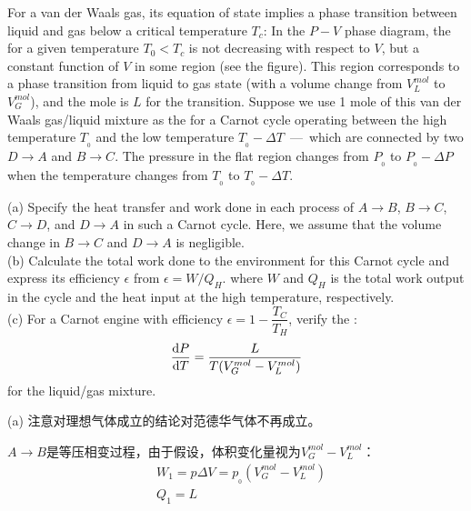 \begin{solution}
    For a van der Waals gas, its equation of state implies a phase transition between
    liquid and gas below a critical temperature $T_c$: In the $P-V$ phase
    diagram, the  for a given temperature $T_{0} < T_{c}$ is not 
    decreasing with respect to $V$, but a constant function of $V$ in some region (see the
    figure). This region corresponds to a phase transition from liquid to gas state (with a
    volume change from $V_{L}^{mol}$ to $V_{G}^{mol}$), and the mole  is $L$ for the transition.
    Suppose we use 1 mole of this van der Waals gas/liquid mixture as the  for
    a Carnot cycle operating between the high temperature $T_{_0}$ and the low temperature
    $T_{_0}-\Delta T$\ —\ which are connected by two  $D\rightarrow A$ and $B\rightarrow C$.
    The pressure in the flat region changes from $P_{_0}$ to $P_{_0}-\Delta P$ when the temperature
    changes from $T_{_0}$ to $T_{_0}-\Delta T$.

    (a) Specify the heat transfer and work done in each process of $A\rightarrow B$, $B\rightarrow C$,
    $C\rightarrow D$, and $D\rightarrow A$ in such a Carnot cycle. Here, we assume that the volume
    change in $B\rightarrow C$ and $D\rightarrow A$ is negligible.\\
    (b) Calculate the total work done to the environment for this Carnot cycle and express
    its efficiency $\epsilon$ from $\epsilon = W/Q_H$. where $W$ and $Q_H$ is the total work output in
    the cycle and the heat input at the high temperature, respectively.\\
    (c) For a Carnot engine with efficiency $\epsilon = 1-\dfrac{T_C}{T_H}$, verify the :
    \begin{equation*}
        \frac{\dif{P}}{\dif{T}}=\frac{L}{T(V_{G}^{mol}-V_{L}^{mol})}
    \end{equation*}
    for the liquid/gas mixture.

    \tcbrule

    (a) 注意对理想气体成立的结论对范德华气体不再成立。

    $A\rightarrow B$是等压相变过程，由于假设，体积变化量视为$V_{G}^{mol}-V_{L}^{mol}$：
    \begin{equation*}
        \begin{aligned}
             & W_1 = p\Delta V = p_{_0}(V_{G}^{mol}-V_{L}^{mol}) \\
             & Q_1 = L
        \end{aligned}
    \end{equation*}


\end{solution}
